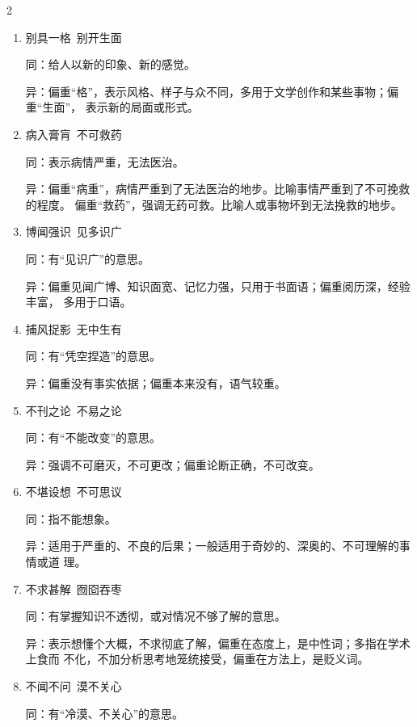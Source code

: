 \documentclass[final,oneside]{ctexbook}
\begin{document}
\begin{multicols}{2}
\begin{enumerate}
      同：有“主次关系处理不当”的意思。

      异：强调把主次关系颠倒了；偏重舍弃主要的，追求次要的。

    \item 别具一格~别开生面

      同：给人以新的印象、新的感觉。

      异：偏重“格”，表示风格、样子与众不同，多用于文学创作和某些事物；偏重“生面”，
      表示新的局面或形式。

    \item 病入膏肓~不可救药

      同：表示病情严重，无法医治。

      异：偏重“病重”，病情严重到了无法医治的地步。比喻事情严重到了不可挽救的程度。
      偏重“救药”，强调无药可救。比喻人或事物坏到无法挽救的地步。

    \item 博闻强识~见多识广

      同：有“见识广”的意思。

      异：偏重见闻广博、知识面宽、记忆力强，只用于书面语；偏重阅历深，经验丰富，
      多用于口语。

    \item 捕风捉影~无中生有

      同：有“凭空捏造”的意思。

      异：偏重没有事实依据；偏重本来没有，语气较重。

    \item 不刊之论~不易之论

      同：有“不能改变”的意思。

      异：强调不可磨灭，不可更改；偏重论断正确，不可改变。

    \item 不堪设想~不可思议

      同：指不能想象。

      异：适用于严重的、不良的后果；一般适用于奇妙的、深奥的、不可理解的事情或道
      理。

    \item 不求甚解~囫囵吞枣

      同：有掌握知识不透彻，或对情况不够了解的意思。

      异：表示想懂个大概，不求彻底了解，偏重在态度上，是中性词；多指在学术上食而
      不化，不加分析思考地笼统接受，偏重在方法上，是贬义词。

    \item 不闻不问~漠不关心

      同：有“冷漠、不关心”的意思。


\end{enumerate}
\end{multicols}
\end{document}
